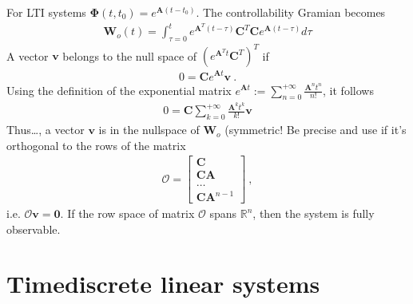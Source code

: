 \documentclass[letterpaper,10pt,english]{jupyterBook}
\begin{document}
\sphinxAtStartPar
For LTI systems \(\boldsymbol\Phi(t,t_0) = e^{\mathbf{A}(t-t_0)}\). The controllability Gramian becomes
\begin{equation*}
\begin{split}\mathbf{W}_o(t) = \int_{\tau=0}^{t} e^{\mathbf{A}^T (t-\tau)} \mathbf{C}^T \mathbf{C} e^{\mathbf{A} (t-\tau)} d \tau\end{split}
\end{equation*}
\sphinxAtStartPar
A vector \(\mathbf{v}\) belongs to the null space of \(\left( e^{\mathbf{A}^T t} \mathbf{C}^T \right)^T\) if
\begin{equation*}
\begin{split}0 = \mathbf{C} e^{\mathbf{A} t} \mathbf{v} \ .\end{split}
\end{equation*}
\sphinxAtStartPar
Using the definition of the exponential matrix \(e^{\mathbf{A}t} := \sum_{n=0}^{+\infty} \frac{\mathbf{A}^n t^n}{n!}\), it follows
\begin{equation*}
\begin{split}0 = \mathbf{C} \sum_{k=0}^{+\infty} \frac{\mathbf{A}^k t^k}{k!} \mathbf{v} \end{split}
\end{equation*}
\sphinxAtStartPar
Thus…, a vector \(\mathbf{v}\) is in the null\sphinxhyphen{}space of \(\mathbf{W}_o\) (symmetric! Be precise and use {\hyperref[\detokenize{ch/linear-algebra/matrices:math-linear-algebra-thms-raperpkah}]{}} if it’s orthogonal to the rows of the matrix
\begin{equation*}
\begin{split}\mathcal{O} = \begin{bmatrix} \mathbf{C} \\ \mathbf{C} \mathbf{A} \\ \dots \\ \mathbf{C} \mathbf{A}^{n-1} \end{bmatrix} \ ,\end{split}
\end{equation*}
\sphinxAtStartPar
i.e. \(\mathcal{O} \mathbf{v} = \mathbf{0}\). If the row space of matrix \(\mathcal{O}\) spans \(\mathbb{R}^n\), then the system is fully observable.


\section{Time\sphinxhyphen{}discrete linear systems}
\label{\detokenize{ch/system-theory/observability-detectability:time-discrete-linear-systems}}\label{\detokenize{ch/system-theory/observability-detectability:observability-detectability-time-discrete}}
\sphinxstepscope
\end{document}
